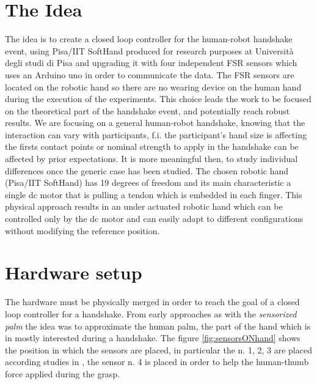 \cite{facialexpressions}
\cite{mirrorgame}
\cite{papageorgiou}

\chapter{The Idea}
The idea is to create a closed loop controller for the human-robot handshake event, using Pisa/IIT SoftHand produced for research purposes at Universit\`a degli studi di Pisa and upgrading it with four independent FSR sensors which uses an Arduino uno in order to communicate the data.
The FSR sensors are located on the robotic hand so there are no wearing device on the human hand during the execution of the experiments.
This choice leads the work to be focused on the theoretical part of the handshake event, and potentially reach robust results. We are focusing on a general human-robot handshake, knowing that the interaction can vary with participants, f.i. the participant's hand size is affecting the firsts contact points or nominal strength to apply in the handshake can be affected by prior expectations. It is more meaningful then, to study individual differences once the generic case has been studied.
The chosen robotic hand (Pisa/IIT SoftHand) has 19 degrees of freedom and its main characteristic a single dc motor that is pulling a tendon which is embedded in each finger. This physical approach results in an under actuated robotic hand which can be controlled only by the dc motor and can easily adapt to different configurations without modifying the reference position. 

\chapter{Hardware setup}
The hardware must be physically merged in order to reach the goal of a closed loop controller for a handshake. From early approaches as \cite{espen} with the \textit{sensorized palm} the idea was to approximate the human palm, the part of the hand which is in mostly interested during a handshake.
The figure \ref{fig:sensorsONhand} shows the position in which the sensors are placed, in particular the n. 1, 2, 3 are placed according studies in \cite{espen}, the sensor n. 4 is placed in order to help the human-thumb force applied during the grasp.

